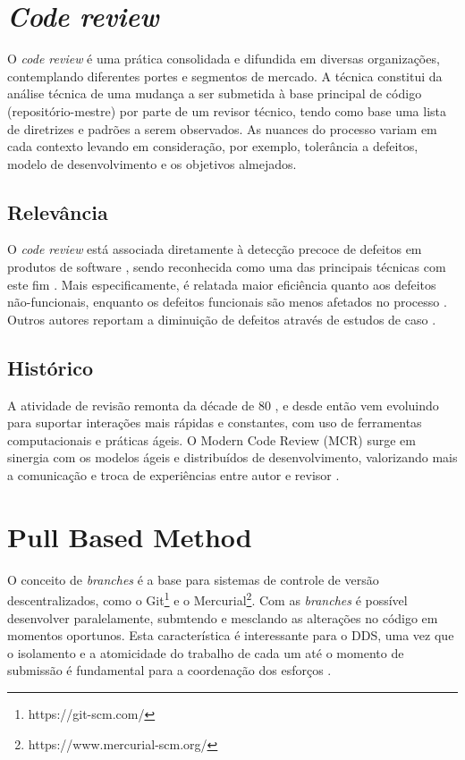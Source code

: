 \documentclass[a4paper,12pt]{monografia}
\theoremstyle{plain}
\theoremstyle{definition}
\theoremstyle{remark}
\begin{document}
\section{\textit{Code review}}\label{sec:code_review}
  O \textit{code review} é uma prática consolidada e difundida em diversas organizações, contemplando diferentes portes e segmentos de mercado. A técnica constitui da análise técnica de uma mudança a ser submetida à base principal de código (repositório-mestre) por parte de um revisor técnico, tendo como base uma lista de diretrizes e padrões a serem observados. As nuances do processo variam em cada contexto levando em consideração, por exemplo, tolerância a defeitos, modelo de desenvolvimento e os objetivos almejados.

\subsection{Relevância}\label{sec:relevancia}
  O \textit{code review} está associada diretamente à detecção precoce de defeitos em produtos de software \cite{schettino2014,Kemerer2009}, sendo reconhecida como uma das principais técnicas com este fim \cite{Boehm2001}. Mais especificamente, é relatada maior eficiência quanto aos defeitos não-funcionais, enquanto os defeitos funcionais são menos afetados no processo \cite{Beller2014202}. Outros autores reportam a diminuição de defeitos através de estudos de caso \cite{McIntosh2014192,Bavota201581,Morales2015171}.

\subsection{Histórico}\label{sec:historico}
  A atividade de revisão remonta da décade de 80 \cite{Fagan1976}, e desde então vem evoluindo para suportar interações mais rápidas e constantes, com uso de ferramentas computacionais e práticas ágeis. O Modern Code Review (MCR) surge em sinergia com os modelos ágeis e distribuídos de desenvolvimento, valorizando mais a comunicação e troca de experiências entre autor e revisor \cite{Bacchelli2013}.

\section{Pull Based Method}\label{sec:pull_based}
  O conceito de \textit{branches} é a base para sistemas de controle de versão descentralizados, como o  Git\footnote{https://git-scm.com/} e o Mercurial\footnote{https://www.mercurial-scm.org/}. Com as \textit{branches} é possível desenvolver paralelamente, submtendo e mesclando as alterações no código em momentos oportunos. Esta característica é interessante para o DDS, uma vez que o isolamento e a atomicidade do trabalho de cada um até o momento de submissão é fundamental para a coordenação dos esforços \cite{barr2012}.
\end{document}
